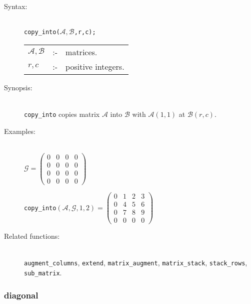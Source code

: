 \begin{description}
\item[Syntax:]\mbox{}\\
\texttt{copy\_into($\mathcal{A,B}$,r,c);}\\[2mm]
\begin{tabular}{l l l}
$\mathcal{A,B}$ &:-& matrices. \\
$r,c$          &:-& positive integers.
\end{tabular}

\item[Synopsis:]\mbox{}\\
\texttt{copy\_into} copies matrix $\mathcal{A}$ into
                $\mathcal{B}$ with $\mathcal{A}(1,1)$ at $\mathcal{B}(r,c)$.

\item[Examples:]\mbox{}\\
  \(\mathcal{G} = \begin{pmatrix} 0 & 0 & 0 & 0 \\ 0 & 0 & 0 & 0 \\
    0 & 0 & 0 & 0 \\ 0 & 0 & 0 & 0 \end{pmatrix}\)

  \texttt{copy\_into}\((\mathcal{A,G},1,2)  =
  \begin{pmatrix} 0 & 1 & 2 & 3 \\ 0 & 4 & 5 & 6 \\ 0 & 7 & 8
    & 9 \\ 0 & 0 & 0 & 0  \end{pmatrix}\)

\item[Related functions:]\mbox{}\\
\texttt{augment\_columns}, \texttt{extend}, \texttt{matrix\_augment},
\texttt{matrix\_stack}, \texttt{stack\_rows}, \texttt{sub\_matrix}.

\end{description}


\subsubsection{diagonal}
\label{linalg:diagonal}

